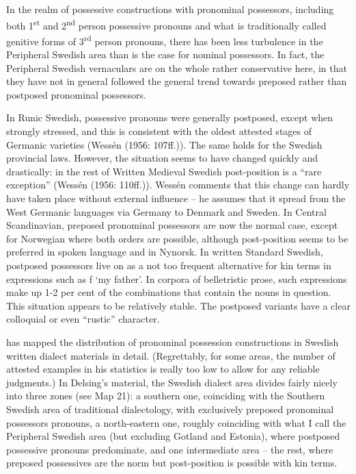 In the realm of possessive constructions with pronominal possessors, including both 1\textsuperscript{st} and 2\textsuperscript{nd} person possessive pronouns and what is traditionally called genitive forms of 3\textsuperscript{rd} person pronouns, there has been less turbulence in the Peripheral Swedish area than is the case for nominal possessors. In fact, the Peripheral Swedish vernaculars are on the whole rather conservative here, in that they have not in general followed the general trend towards preposed rather than postposed pronominal possessors. 


In Runic Swedish, possessive pronouns were generally postposed, except when strongly stressed, and this is consistent with the oldest attested stages of Germanic varieties (Wessén (1956: 107ff.)). The same holds for the Swedish provincial laws. However, the situation seems to have changed quickly and drastically: in the rest of Written Medieval Swedish post-position is a “rare exception” (Wessén (1956: 110ff.)). Wessén comments that this change can hardly have taken place without external influence – he assumes that it spread from the West Germanic languages via Germany to Denmark and Sweden. In Central Scandinavian, preposed pronominal possessors are now the normal case, except for Norwegian where both orders are possible, although post-position seems to be preferred in spoken language and in Nynorsk. In written Standard Swedish, postposed possessors live on as a not too frequent alternative for kin terms in expressions such as f ‘my father’. In corpora of belletristic prose, such expressions make up 1-2 per cent of the combinations that contain the nouns in question. This situation appears to be relatively stable. The postposed variants have a clear colloquial or even “rustic” character. 


\citet[32]{Delsing2003a} has mapped the distribution of pronominal possession constructions in Swedish written dialect materials in detail. (Regrettably, for some areas, the number of attested examples in his statistics is really too low to allow for any reliable judgments.) In Delsing’s material, the Swedish dialect area divides fairly nicely into three zones (see Map 21): a southern one, coinciding with the Southern Swedish area of traditional dialectology, with exclusively preposed pronominal possessors pronouns, a north-eastern one, roughly coinciding with what I call the Peripheral Swedish area (but excluding Gotland and Estonia), where postposed possessive pronouns predominate, and one intermediate area – the rest, where preposed possessives are the norm but post-position is possible with kin terms.

